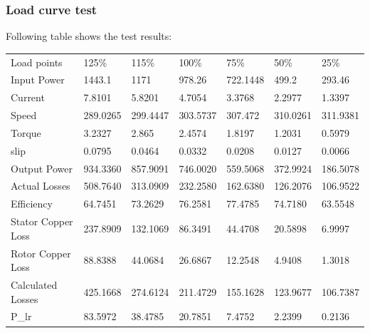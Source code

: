 \subsubsection{Load curve test}
Following table shows the test results:
\begin{table}[hbtp!]
\begin{tabular}{lllllll}
    \rowcolor[HTML]{343434} 
    Load   points                                & 125\%    & 115\%    & 100\%    & 75\%     & 50\%     & 25\%     \\
    \rowcolor[HTML]{F2F2F2} 
    \cellcolor[HTML]{9B9B9B}Input   Power        & 1443.1   & 1171     & 978.26   & 722.1448 & 499.2    & 293.46   \\
    \cellcolor[HTML]{9B9B9B}Current              & 7.8101   & 5.8201   & 4.7054   & 3.3768   & 2.2977   & 1.3397   \\
    \rowcolor[HTML]{F2F2F2} 
    \cellcolor[HTML]{9B9B9B}Speed                & 289.0265 & 299.4447 & 303.5737 & 307.472  & 310.0261 & 311.9381 \\
    \cellcolor[HTML]{9B9B9B}Torque               & 3.2327   & 2.865    & 2.4574   & 1.8197   & 1.2031   & 0.5979   \\
    \rowcolor[HTML]{F2F2F2} 
    \cellcolor[HTML]{9B9B9B}slip                 & 0.0795   & 0.0464   & 0.0332   & 0.0208   & 0.0127   & 0.0066   \\
    \cellcolor[HTML]{9B9B9B}Output   Power       & 934.3360 & 857.9091 & 746.0020 & 559.5068 & 372.9924 & 186.5078 \\
    \rowcolor[HTML]{F2F2F2} 
    \cellcolor[HTML]{9B9B9B}Actual   Losses      & 508.7640 & 313.0909 & 232.2580 & 162.6380 & 126.2076 & 106.9522 \\
    \cellcolor[HTML]{9B9B9B}Efficiency           & 64.7451  & 73.2629  & 76.2581  & 77.4785  & 74.7180  & 63.5548  \\
    \rowcolor[HTML]{F2F2F2} 
    \cellcolor[HTML]{9B9B9B}Stator   Copper Loss & 237.8909 & 132.1069 & 86.3491  & 44.4708  & 20.5898  & 6.9997   \\
    \cellcolor[HTML]{9B9B9B}Rotor   Copper Loss  & 88.8388  & 44.0684  & 26.6867  & 12.2548  & 4.9408   & 1.3018   \\
    \rowcolor[HTML]{F2F2F2} 
    \cellcolor[HTML]{9B9B9B}Calculated   Losses  & 425.1668 & 274.6124 & 211.4729 & 155.1628 & 123.9677 & 106.7387 \\
    \cellcolor[HTML]{9B9B9B}P\_lr                & 83.5972  & 38.4785  & 20.7851  & 7.4752   & 2.2399   & 0.2136  
\end{tabular}
\end{table}

